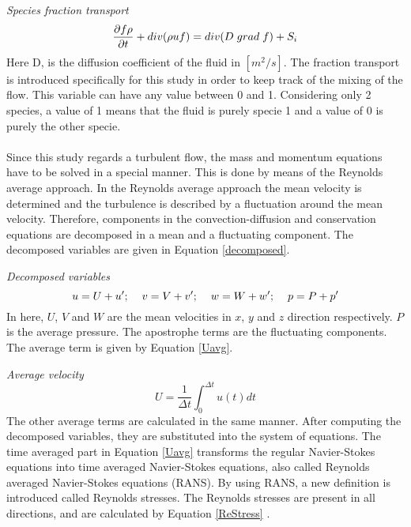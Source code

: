\documentclass{CFD2017}
\begin{document}
\emph{Species fraction transport}
\begin{equation}
\label{fractrans}
\frac{\partial f\rho }{\partial t} +div( \rho \boldmath{u} f) = div(D \hspace{1mm}grad\hspace{1mm}f) +S_i 
\end{equation}
Here D, is the diffusion coefficient of the fluid in $[m^2/s]$. The fraction transport is introduced specifically for this study in order to keep track of the mixing of the flow. This variable can have any value between 0 and 1. Considering only 2 species, a value of 1 means that the fluid is purely specie 1 and a value of 0 is purely the other specie. \\ \\
Since this study regards a turbulent flow, the mass and momentum equations have to be solved in a special manner. This is done by means of the Reynolds average approach. In the Reynolds average approach the mean velocity is determined and the turbulence is described by a fluctuation around the mean velocity. Therefore, components in the convection-diffusion and conservation equations are decomposed in a mean and a fluctuating component. The decomposed variables are given in Equation \ref{decomposed}.\vspace{2mm}

\emph{Decomposed variables}
\begin{equation}
\label{decomposed}
u=U+u'; \hspace{4mm} v = V+v'; \hspace{4mm} w=W+w'; \hspace{4mm} p=P+p' 
\end{equation}
In here, $U$, $V$ and $W$ are the mean velocities in $x$, $y$ and $z$ direction respectively. $P$ is the average pressure. The apostrophe terms are the fluctuating components. The average term is given by Equation \ref{Uavg}.\vspace{2mm}

\emph{Average velocity}
\begin{equation}
\label{Uavg}
U = \frac{1}{\Delta t}\int_{0}^{\Delta t}u(t)dt
\end{equation}
The other average terms are calculated in the same manner. After computing the decomposed variables, they are substituted into the system of equations. The time averaged part in Equation \ref{Uavg} transforms the regular Navier-Stokes equations into time averaged Navier-Stokes equations, also called Reynolds averaged Navier-Stokes equations (RANS). By using RANS, a new definition is introduced called Reynolds stresses. The Reynolds stresses are present in all directions, and are calculated by Equation \ref{ReStress} \cite{slides}. \vspace{2mm}
\end{document}
